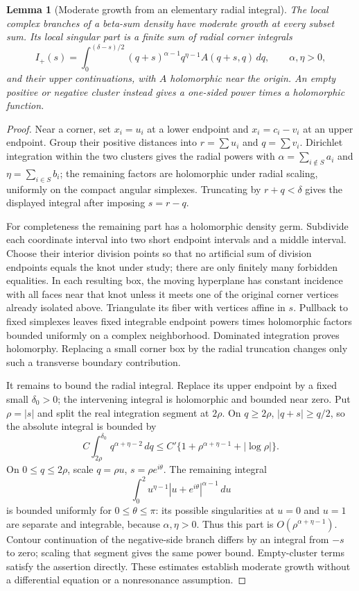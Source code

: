 \documentclass[11pt,a4paper]{article}
\newtheorem{lemma}[theorem]{Lemma}
\theoremstyle{definition}
\theoremstyle{remark}
\numberwithin{equation}{section}
\begin{document}
\begin{lemma}[Moderate growth from an elementary radial integral]
\label{p9:bsc:moderate}
The local complex branches of a beta-sum density have moderate growth
at every subset sum. Its local singular part is a finite sum of
radial corner integrals
\[
 I_+(s)=\int_0^{(\delta-s)/2}
      (q+s)^{\alpha-1}q^{\eta-1}A(q+s,q)\,dq,
 \qquad \alpha,\eta>0,
\]
and their upper continuations, with $A$ holomorphic near the origin.
An empty positive or negative cluster instead gives a one-sided
power times a holomorphic function.
\end{lemma}
\begin{proof}
Near a corner, set $x_i=u_i$ at a lower endpoint and
$x_i=c_i-v_i$ at an upper endpoint. Group their positive distances
into $r=\sum u_i$ and $q=\sum v_i$. Dirichlet integration within
the two clusters gives the radial powers with
$\alpha=\sum_{i\notin S}a_i$ and $\eta=\sum_{i\in S}b_i$;
the remaining factors are holomorphic under radial scaling, uniformly
on the compact angular simplexes. Truncating by $r+q<\delta$ gives
the displayed integral after imposing $s=r-q$.

For completeness the remaining part has a holomorphic density germ.
Subdivide each coordinate interval into two short endpoint intervals
and a middle interval. Choose their interior division points so that
no artificial sum of division endpoints equals the knot under study;
there are only finitely many forbidden equalities. In each resulting
box, the moving hyperplane has constant incidence with all faces
near that knot unless it meets one of the original corner vertices
already isolated above. Triangulate its fiber with vertices affine
in $s$. Pullback to fixed simplexes leaves fixed integrable endpoint
powers times holomorphic factors bounded uniformly on a complex
neighborhood. Dominated integration proves holomorphy. Replacing
a small corner box by the radial truncation changes only such a
transverse boundary contribution.

It remains to bound the radial integral. Replace its upper endpoint
by a fixed small $\delta_0>0$; the intervening integral is holomorphic
and bounded near zero. Put $\rho=|s|$ and split the real integration
segment at $2\rho$. On $q\ge2\rho$, $|q+s|\ge q/2$, so the
absolute integral is bounded by
\[
 C\int_{2\rho}^{\delta_0}q^{\alpha+\eta-2}\,dq
 \le C'\{1+\rho^{\alpha+\eta-1}+|\log\rho|\}.
\]
On $0\le q\le2\rho$, scale $q=\rho u$, $s=\rho e^{i\theta}$.
The remaining integral
\[
 \int_0^2u^{\eta-1}|u+e^{i\theta}|^{\alpha-1}\,du
\]
is bounded uniformly for $0\le\theta\le\pi$: its possible
singularities at $u=0$ and $u=1$ are separate and integrable,
because $\alpha,\eta>0$. Thus this part is $O(\rho^{\alpha+\eta-1})$.
Contour continuation of the negative-side branch differs by an
integral from $-s$ to zero; scaling that segment gives the same
power bound. Empty-cluster terms satisfy the assertion directly.
These estimates establish moderate growth without a differential
equation or a nonresonance assumption.
\end{proof}
\end{document}
